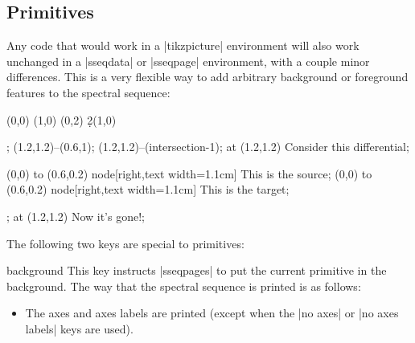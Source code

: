 \documentclass{ltxdoc}
\begin{document}
\begin{sseqdata}[name=ex1,degree={#1}{1-#1}]
\subsection{\tikzname\space Primitives}
Any code that would work in a |tikzpicture| environment will also work unchanged in a |sseqdata| or |sseqpage| environment, with a couple minor differences. This is a very flexible way to add arbitrary background or foreground features to the spectral sequence:
\begin{codeexample}[]
\begin{sseqdata}[name=tikz example,Adams grading,x range={0}{2}, x axis extend end=2em]
\class(0,0)
\class(1,0)
\class(0,2)
\d2(1,0)
\end{sseqdata}
%
\begin{sseqpage}[name=tikz example]
\begin{scope}[blue,font=\tiny]
\node[name path=myellipse, draw, ellipse, inner sep=4pt, scale=0.7, rotate fit=26.5,
      fit=(sseq{1,0,1}) (sseq{0,2,1})] {}; %
\path[name path=myline](1.2,1.2)--(0.6,1);
\draw[->,name intersections={of=myellipse and myline}] (1.2,1.2)--(intersection-1);
\node[right,text width=1.6cm] at (1.2,1.2) {Consider this differential};
\end{scope}
\end{sseqpage}
%
\begin{sseqpage}[name=tikz example]
\begin{scope}[<-,blue,font=\tiny]
\draw[xshift=1](0,0) to (0.6,0.2) node[right,text width=1.1cm] {This is the source};
\draw[yshift=2](0,0) to (0.6,0.2) node[right,text width=1.1cm] {This is the target};
\end{scope}
\end{sseqpage}
%
\begin{sseqpage}[name=tikz example]
\node[draw,ellipse,blue,inner sep=4pt,scale=0.7,rotate fit=26.5,fit=(sseq{1,0,1}) (sseq{0,2,1})] {};
\node[right,blue,font=\tiny] at (1.2,1.2) {Now it's gone!};
\end{sseqpage}
\end{codeexample}

The following two keys are special to \tikzname\space primitives:
\begin{key}{background}
This key instructs |sseqpages| to put the current \tikzname\space primitive in the background. The way that the spectral sequence is printed is as follows:
\begin{itemize}
\item The axes and axes labels are printed (except when the |no axes| or |no axes labels| keys are used).


\end{itemize}
\end{key}
\end{sseqdata}
\end{document}
